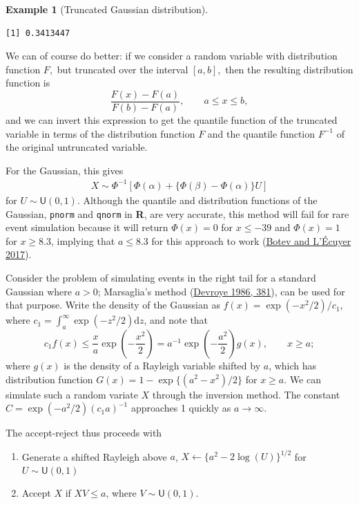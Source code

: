 \documentclass[
  11pt,
  letterpaper,
]{scrbook}
\providecommand{\tightlist}{%
  \setlength{\itemsep}{0pt}\setlength{\parskip}{0pt}}\usepackage{longtable,booktabs,array}
\theoremstyle{definition}
\newtheorem{example}{Example}[chapter]
\theoremstyle{definition}
\theoremstyle{definition}
\theoremstyle{plain}
\theoremstyle{remark}
\begin{document}
\begin{example}[Truncated Gaussian
distribution]
\begin{verbatim}
[1] 0.3413447
\end{verbatim}

We can of course do better: if we consider a random variable with
distribution function \(F,\) but truncated over the interval \([a,b],\)
then the resulting distribution function is
\[\frac{F(x) - F(a)}{F(b)-F(a)}, \qquad a \leq x \leq b,\] and we can
invert this expression to get the quantile function of the truncated
variable in terms of the distribution function \(F\) and the quantile
function \(F^{-1}\) of the original untruncated variable.

For the Gaussian, this gives \begin{align*}
X \sim \Phi^{-1}\left[\Phi(\alpha) + \{\Phi(\beta)-\Phi(\alpha)\}U\right]
\end{align*} for \(U \sim \mathsf{U}(0,1)\). Although the quantile and
distribution functions of the Gaussian, \texttt{pnorm} and
\texttt{qnorm} in \textbf{R}, are very accurate, this method will fail
for rare event simulation because it will return \(\Phi(x) = 0\) for
\(x \leq -39\) and \(\Phi(x)=1\) for \(x \geq 8.3\), implying that
\(a \leq 8.3\) for this approach to work
(\protect\hyperlink{ref-LEcuyer.Botev:2017}{Botev and L'Écuyer 2017}).

Consider the problem of simulating events in the right tail for a
standard Gaussian where \(a > 0\); Marsaglia's method
(\protect\hyperlink{ref-Devroye:1986}{Devroye 1986, 381}), can be used
for that purpose. Write the density of the Gaussian as
\(f(x) = \exp(-x^2/2)/c_1\), where
\(c_1 = \int_{a}^{\infty}\exp(-z^2/2)\mathrm{d} z\), and note that
\[c_1f(x) \leq \frac{x}{a}\exp\left(-\frac{x^2}{2}\right)= a^{-1}\exp\left(-\frac{a^2}{2}\right)g(x), \qquad x \geq a;\]
where \(g(x)\) is the density of a Rayleigh variable shifted by \(a\),
which has distribution function \(G(x) = 1-\exp\{(a^2-x^2)/2\}\) for
\(x \geq a\). We can simulate such a random variate \(X\) through the
inversion method. The constant \(C= \exp(-a^2/2)(c_1a)^{-1}\) approaches
1 quickly as \(a \to \infty\).

The accept-reject thus proceeds with

\begin{enumerate}
\def\labelenumi{\arabic{enumi}.}
\tightlist
\item
  Generate a shifted Rayleigh above \(a\),
  \(X \gets \{a^2 - 2\log(U)\}^{1/2}\) for \(U \sim \mathsf{U}(0,1)\)
\item
  Accept \(X\) if \(XV \leq a\), where \(V \sim \mathsf{U}(0,1)\).
\end{enumerate}


\end{example}
\end{document}
